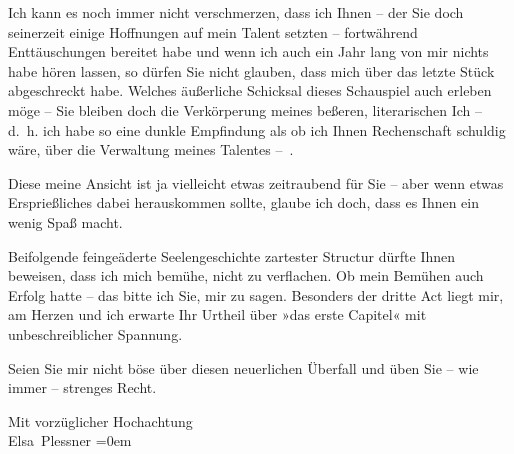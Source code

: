 \pstart
           {\pb}Ich kann es noch immer nicht verschmerzen, dass ich Ihnen – der Sie doch
               seinerzeit einige Hoffnungen auf mein Talent setzten – fortwährend Enttäuschungen
               bereitet habe und wenn ich auch ein Jahr lang von mir nichts habe hören lassen, so
               dürfen Sie nicht glauben, dass mich \label{K_L03723-1v}\label{K_L03723-1}
               über das letzte Stück
               abgeschreckt habe. Welches äußerliche Schicksal dieses Schauspiel auch erleben möge – Sie bleiben
               doch die Verkörperung meines beßeren, literarischen Ich – d. h. ich habe so eine {\pb}dunkle Empfindung als ob ich Ihnen Rechenschaft schuldig wäre, über die
               Verwaltung meines Talentes – .\pend
           
\pstart
           Diese meine Ansicht ist ja vielleicht etwas zeitraubend für Sie – aber wenn etwas
               Ersprießliches dabei herauskommen sollte, glaube ich doch, dass es Ihnen ein wenig
               Spaß macht.\pend
           
\pstart
           Beifolgende feingeäderte Seelengeschichte zartester Structur dürfte Ihnen beweisen, dass ich mich
               bemühe, nicht zu verflachen. Ob mein Bemühen auch {\pb}Erfolg hatte – das
               bitte ich Sie, mir zu sagen. Besonders der dritte Act liegt mir, am Herzen und ich
               erwarte Ihr Urtheil über »das erste Capitel«
               mit unbeschreiblicher Spannung.\pend
           
\pstart
           Seien Sie mir nicht böse über diesen neuerlichen Überfall und üben Sie – wie immer –
               strenges Recht.\pend
           
\pstart
           Mit vorzüglicher Hochachtung{\\[\baselineskip]}\spacefill\mbox{Elsa Plessner}\pend
           \leftskip=0em{}\endnumbering{}
\begin{anhang}
\end{anhang}
      